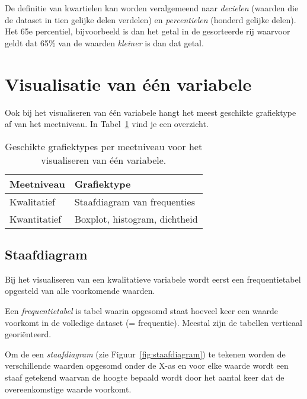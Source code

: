 De definitie van kwartielen kan worden veralgemeend naar \emph{decielen} (waarden die de dataset in tien gelijke delen verdelen) en \emph{percentielen} (honderd gelijke delen). Het 65e percentiel, bijvoorbeeld is dan het getal in de gesorteerde rij waarvoor geldt dat 65\% van de waarden \emph{kleiner} is dan dat getal.

\section{Visualisatie van één variabele}

Ook bij het visualiseren van één variabele hangt het meest geschikte grafiektype af van het meetniveau. In Tabel~\ref{tab:grafiektypes-1-variabele} vind je een overzicht.

\begin{table}
  \centering
  \begin{tabular}{ll}
  	\toprule
  	\textbf{Meetniveau} & \textbf{Grafiektype}          \\
  	\midrule
  	Kwalitatief         & Staafdiagram van frequenties  \\
  	\midrule
  	Kwantitatief        & Boxplot, histogram, dichtheid \\
  	\bottomrule
  \end{tabular}
  \caption{Geschikte grafiektypes per meetniveau voor het visualiseren van één variabele.}
  \label{tab:grafiektypes-1-variabele}
\end{table}

\subsection{Staafdiagram}

Bij het visualiseren van een kwalitatieve variabele wordt eerst een frequentietabel opgesteld van alle voorkomende waarden.

\begin{definition}[Frequentietabel]
  Een \emph{frequentietabel} is tabel waarin opgesomd staat hoeveel keer een waarde voorkomt in de volledige dataset (= frequentie). Meestal zijn de tabellen verticaal georiënteerd.
\end{definition}

Om de een \emph{staafdiagram} (zie Figuur~\ref{fig:staafdiagram}) te tekenen worden de verschillende waarden opgesomd onder de X-as en voor elke waarde wordt een staaf getekend waarvan de hoogte bepaald wordt door het aantal keer dat de overeenkomstige waarde voorkomt.

